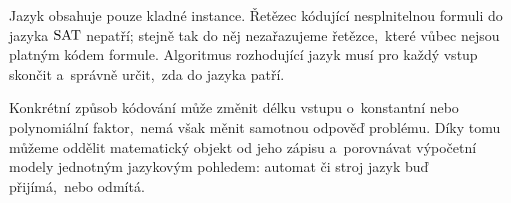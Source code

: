 Jazyk obsahuje pouze kladné instance. Řetězec kódující nesplnitelnou formuli do jazyka $\operatorname{SAT}$ nepatří; stejně tak do něj nezařazujeme řetězce,~které vůbec nejsou platným kódem formule. Algoritmus rozhodující jazyk musí pro každý vstup skončit a~správně určit,~zda do jazyka patří.

Konkrétní způsob kódování může změnit délku vstupu o~konstantní nebo polynomiální faktor,~nemá však měnit samotnou odpověď problému. Díky tomu můžeme oddělit matematický objekt od jeho zápisu a~porovnávat výpočetní modely jednotným jazykovým pohledem: automat či stroj jazyk buď přijímá,~nebo odmítá.
